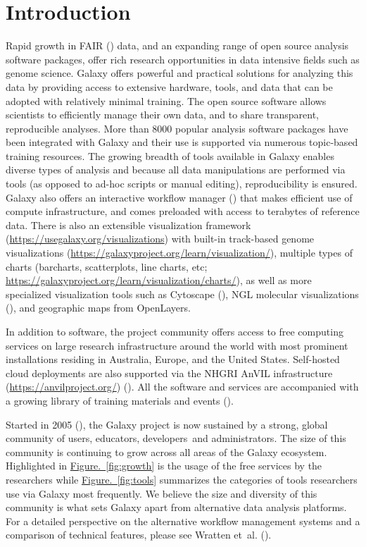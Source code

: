 \section*{Introduction}
Rapid growth in FAIR (\cite{Wilkinson_2016}) data, and an expanding range of open source analysis software packages, offer rich research opportunities in data intensive fields such as genome science. Galaxy offers powerful and practical solutions for analyzing this data by providing access to extensive hardware, tools, and data that can be adopted with relatively minimal training. The open source software allows scientists to efficiently manage their own data, and to share transparent, reproducible analyses. More than 8000 popular analysis software packages have been integrated with Galaxy and their use is supported via numerous topic-based training resources. The growing breadth of tools available in Galaxy enables diverse types of analysis and because all data manipulations are performed via tools (as opposed to ad-hoc scripts or manual editing), reproducibility is ensured. Galaxy also offers an interactive workflow manager (\cite{Jalili_2020}) that makes efficient use of compute infrastructure, and comes preloaded with access to terabytes of reference data. There is also an extensible visualization framework (\url{https://usegalaxy.org/visualizations}) with built-in track-based genome visualizations (\url{https://galaxyproject.org/learn/visualization/}), multiple types of charts (barcharts, scatterplots, line charts, etc; \url{https://galaxyproject.org/learn/visualization/charts/}), as well as more specialized visualization tools such as Cytoscape (\cite{Shannon_2003}), NGL molecular visualizations (\cite{Rose_2018}), and geographic maps from OpenLayers.

In addition to software, the project community offers access to free computing services on large research infrastructure around the world with most prominent installations residing in Australia, Europe, and the United States. Self-hosted cloud deployments are also supported via the NHGRI AnVIL infrastructure (\url{https://anvilproject.org/}) (\cite{Schatz_2022}). All the software and services are accompanied with a growing library of training materials and events (\cite{batut2018community}).

Started in 2005 (\cite{Giardine_2005}), the Galaxy project is now sustained by a strong, global community of users, educators, developers and administrators. The size of this community is continuing to grow across all areas of the Galaxy ecosystem. Highlighted in \hyperref[fig:growth]{Figure.~\ref{fig:growth}} is the usage of the free services by the researchers while \hyperref[fig:tools]{Figure.~\ref{fig:tools}} summarizes the categories of tools researchers use via Galaxy most frequently. We believe the size and diversity of this community is what sets Galaxy apart from alternative data analysis platforms. For a detailed perspective on the alternative workflow management systems and a comparison of technical features, please see Wratten et al. (\cite{Wratten_2021}).

